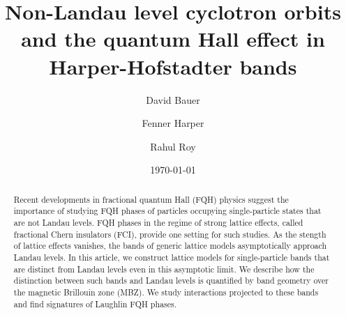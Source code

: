 \documentclass[aps,prb,twocolumn,letterpaper,twoside,nobalancelastpage,groupedaddress,amsmath,amssymb,floatfix,citeautoscript]{revtex4-1}
\begin{document}
\def \Ns {\mathbb{N}}
\def \Rs {\mathbb{R}}
\def \Zs {\mathbb{Z}}
\def \Qs {\mathbb{Q}}
\def \Cs {\mathbb{C}}
\def \id {\mathbb{I}}

\def \bfq {{\bf q}}
\def \bfp {{\bf p}}
\def \bfx {{\bf x}}
\def \bfy {{\bf y}}
\def \bfz {{\bf z}}
\def \bfr {{\bf r}}
\def \bfk {{\bf k}}
\def \bfn {{\bf n}}
\def \bfb {{\bf b}}
\def \bfm {\mathbf{m}}
\def \bfn {\mathbf{n}}


\def \hatq {\widehat{q}}
\def \hatp {\widehat{p}}
\def \hata {\widehat{a}}
\def \hatadag {\widehat{a}^{\dagger}}
\def \wtN {\widetilde{N}}

\def \ve {\varepsilon}
\def \vth {\vartheta}

\title{Non-Landau level cyclotron orbits and the quantum Hall effect in Harper-Hofstadter bands}
\author{David Bauer}

\author{Fenner Harper}

\author{Rahul Roy}

\date{\today}
\begin{abstract}
Recent developments in fractional quantum Hall (FQH) physics suggest the importance of studying FQH phases of particles occupying single-particle states that are not Landau levels. FQH phases in the regime of strong lattice effects, called fractional Chern insulators (FCI), provide one setting for such studies. As the stength of lattice effects vanishes, the bands of generic lattice models asymptotically approach Landau levels. In this article, we construct lattice models for single-particle bands that are distinct from Landau levels even in this asymptotic limit. We describe how the distinction between such bands and Landau levels is quantified by band geometry over the magnetic Brillouin zone (MBZ). We study interactions projected to these bands and find signatures of Laughlin FQH phases.
\end{abstract}
\end{document}
